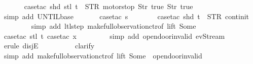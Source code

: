 \begin{isabellebody}
\ \ \ \ \ \isamarkupfalse%
\ {\isacharparenleft}case{\isacharunderscore}tac\ {\isachardoublequoteopen}{\isacharparenleft}shd\ {\isacharparenleft}stl\ t{\isacharparenright}{\isacharparenright}\ {\isacharequal}\ {\isacharparenleft}STR\ {\isacharprime}{\isacharprime}motorstop{\isacharprime}{\isacharprime}{\isacharcomma}\ {\isacharbrackleft}Str\ {\isacharprime}{\isacharprime}true{\isacharprime}{\isacharprime}{\isacharcomma}\ Str\ {\isacharprime}{\isacharprime}true{\isacharprime}{\isacharprime}{\isacharbrackright}{\isacharparenright}{\isachardoublequoteclose}{\isacharparenright}\isanewline
\ \ \ \ \ \isamarkupfalse%
\ {\isacharparenleft}simp\ add{\isacharcolon}\ UNTIL{\isachardot}base{\isacharparenright}\isanewline
\isanewline
\ \ \ \ \ \isamarkupfalse%
\ {\isacharparenleft}case{\isacharunderscore}tac\ {\isachardoublequoteopen}s{\isacharequal}{}{\isachardoublequoteclose}{\isacharparenright}\isanewline
\ \ \ \ \ \ \isamarkupfalse%
\ {\isacharparenleft}case{\isacharunderscore}tac\ {\isachardoublequoteopen}shd\ t\ {\isacharequal}\ {\isacharparenleft}STR\ {\isacharprime}{\isacharprime}continit{\isacharprime}{\isacharprime}{\isacharcomma}\ {\isacharbrackleft}{\isacharbrackright}{\isacharparenright}{\isachardoublequoteclose}{\isacharparenright}\isanewline
\ \ \ \ \ \ \ \isamarkupfalse%
\ {\isacharparenleft}simp\ add{\isacharcolon}\ ltl{\isacharunderscore}step{\isacharunderscore}{}\ make{\isacharunderscore}full{\isacharunderscore}observation{\isachardot}ctr{\isacharbrackleft}of\ lift\ {\isachardoublequoteopen}Some\ {}{\isachardoublequoteclose}{\isacharbrackright}{\isacharparenright}\isanewline
\ \ \ \ \ \ \ \isamarkupfalse%
\ {\isacharparenleft}case{\isacharunderscore}tac\ {\isachardoublequoteopen}stl\ t{\isachardoublequoteclose}{\isacharcomma}\ case{\isacharunderscore}tac\ x{}{\isacharparenright}\isanewline
\ \ \ \ \ \ \ \isamarkupfalse%
\ {\isacharparenleft}simp\ add{\isacharcolon}\ opendoor{\isacharunderscore}invalid\ ev{\isacharunderscore}Stream{\isacharparenright}\isanewline
\ \ \ \ \ \ \ \isamarkupfalse%
\ {\isacharparenleft}erule\ disjE{\isacharparenright}\isanewline
\ \ \ \ \ \ \ \ \isamarkupfalse%
\ clarify\isanewline
\ \ \ \ \ \ \ \ \isamarkupfalse%
\ {\isacharparenleft}simp\ add{\isacharcolon}\ make{\isacharunderscore}full{\isacharunderscore}observation{\isachardot}ctr{\isacharbrackleft}of\ lift\ {\isachardoublequoteopen}Some\ {}{\isachardoublequoteclose}{\isacharbrackright}\ opendoor{\isacharunderscore}invalid{\isacharparenright}\isanewline

\end{isabellebody}
